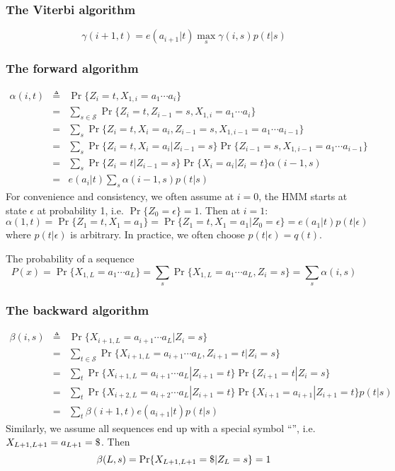 \documentclass[10pt]{article}
\begin{document}
\subsubsection{The Viterbi algorithm}
$$
\gamma(i+1,t)=e(a_{i+1}|t)\max_s\gamma(i,s)p(t|s)
$$

\subsubsection{The forward algorithm}
\begin{eqnarray*}
\alpha(i,t)&\triangleq&\Pr\{Z_i=t,X_{1,i}=a_1\cdots a_i\}\\
&=&\sum_{s\in\mathcal{S}}\Pr\{Z_i=t,Z_{i-1}=s,X_{1,i}=a_1\cdots a_i\}\\
&=&\sum_s\Pr\{Z_i=t,X_i=a_i,Z_{i-1}=s,X_{1,{i-1}}=a_1\cdots a_{i-1}\}\\
&=&\sum_s\Pr\{Z_i=t,X_i=a_i|Z_{i-1}=s\}\Pr\{Z_{i-1}=s,X_{1,{i-1}}=a_1\cdots a_{i-1}\}\\
&=&\sum_s\Pr\{Z_i=t|Z_{i-1}=s\}\Pr\{X_i=a_i|Z_i=t\}\alpha(i-1,s)\\
&=&e(a_i|t)\sum_s\alpha(i-1,s)p(t|s)
\end{eqnarray*}
For convenience and consistency, we often assume at $i=0$, the HMM starts at
state $\epsilon$ at probability 1, i.e. $\Pr\{Z_0=\epsilon\}=1$. Then at $i=1$:
$$
\alpha(1,t)=\Pr\{Z_1=t,X_1=a_1\}=\Pr\{Z_1=t,X_1=a_1|Z_0=\epsilon\}=e(a_1|t)p(t|\epsilon)
$$
where $p(t|\epsilon)$ is arbitrary. In practice, we often choose
$p(t|\epsilon)=q(t)$.

The probability of a sequence
$$
P(x)=\Pr\{X_{1,L}=a_1\cdots a_L\}=\sum_s\Pr\{X_{1,L}=a_1\cdots a_L,Z_i=s\}=\sum_s\alpha(i,s)
$$

\subsubsection{The backward algorithm}
\begin{eqnarray*}
\beta(i,s)&\triangleq&\Pr\{X_{i+1,L}=a_{i+1}\cdots a_L|Z_i=s\}\\
&=&\sum_{t\in\mathcal{S}}\Pr\{X_{i+1,L}=a_{i+1}\cdots a_L,Z_{i+1}=t|Z_i=s\}\\
&=&\sum_t\Pr\{X_{i+1,L}=a_{i+1}\cdots a_L|Z_{i+1}=t\}\Pr\{Z_{i+1}=t|Z_i=s\}\\
&=&\sum_t\Pr\{X_{i+2,L}=a_{i+2}\cdots a_L|Z_{i+1}=t\}\Pr\{X_{i+1}=a_{i+1}|Z_{i+1}=t\}p(t|s)\\
&=&\sum_t\beta(i+1,t)e(a_{i+1}|t)p(t|s)
\end{eqnarray*}
Similarly, we assume all sequences end up with a special symbol
``{\tt{}}'', i.e. $X_{L+1,L+1}=a_{L+1}={\tt\char36}$. Then
$$
\beta(L,s)=\Pr\{X_{L+1,L+1}={\tt\char36}|Z_L=s\}=1
$$
\end{document}
